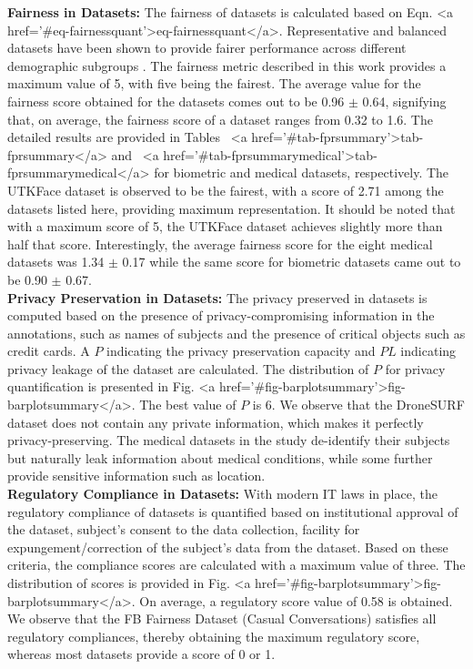 \documentclass[journal]{IEEEtran}
\begin{document}
\noindent \textbf{Fairness in Datasets:} The fairness of datasets is calculated based on Eqn. <a href='#eq-fairnessquant'>eq-fairnessquant</a>. Representative and balanced datasets have been shown to provide fairer performance across different demographic subgroups \cite{wang2021meta}. The fairness metric described in this work provides a maximum value of 5, with five being the fairest. The average value for the fairness score obtained for the datasets comes out to be 0.96 $\pm$ 0.64, signifying that, on average, the fairness score of a dataset ranges from 0.32 to 1.6. The detailed results are provided in Tables ~<a href='#tab-fprsummary'>tab-fprsummary</a> and ~<a href='#tab-fprsummarymedical'>tab-fprsummarymedical</a> for biometric and medical datasets, respectively. The UTKFace dataset is observed to be the fairest, with a score of 2.71 among the datasets listed here, providing maximum representation. It should be noted that with a maximum score of 5, the UTKFace dataset achieves slightly more than half that score. Interestingly, the average fairness score for the eight medical datasets was 1.34 $\pm$ 0.17 while the same score for biometric datasets came out to be 0.90 $\pm$ 0.67.\\

\noindent \textbf{Privacy Preservation in Datasets:} The privacy preserved in datasets is computed based on the presence of privacy-compromising information in the annotations, such as names of subjects and the presence of critical objects such as credit cards. A $P$ indicating the privacy preservation capacity and $PL$ indicating privacy leakage of the dataset are calculated. The distribution of $P$ for privacy quantification is presented in Fig. <a href='#fig-barplotsummary'>fig-barplotsummary</a>. The best value of $P$ is 6. We observe that the DroneSURF dataset does not contain any private information, which makes it perfectly privacy-preserving. The medical datasets in the study de-identify their subjects but naturally leak information about medical conditions, while some further provide sensitive information such as location.
\\

\noindent \textbf{Regulatory Compliance in Datasets: } With modern IT laws in place, the regulatory compliance of datasets is quantified based on institutional approval of the dataset, subject's consent to the data collection, facility for expungement/correction of the subject's data from the dataset. Based on these criteria, the compliance scores are calculated with a maximum value of three. The distribution of scores is provided in Fig. <a href='#fig-barplotsummary'>fig-barplotsummary</a>. On average, a regulatory score value of 0.58 is obtained. We observe that the FB Fairness Dataset (Casual Conversations) satisfies all regulatory compliances, thereby obtaining the maximum regulatory score, whereas most datasets provide a score of 0 or 1. \\
\end{document}

